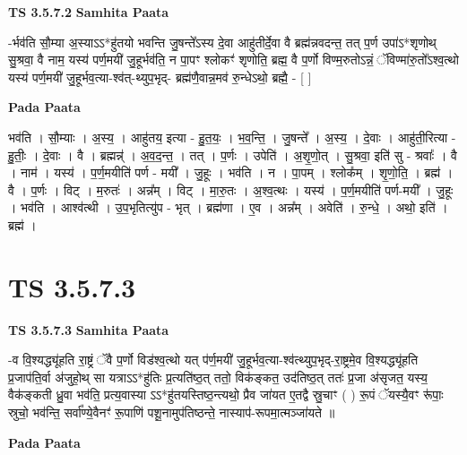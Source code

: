 \documentclass[17pt]{extarticle}
\begin{document}
\textbf{TS 3.5.7.2 } \newline
\textbf{Samhita Paata} \newline

-र्भव॑ति सौ॒म्या अ॒स्याऽऽ*हु॑तयो भवन्ति जु॒षन्ते᳚ऽस्य दे॒वा आहु॑तीर्दे॒वा वै ब्रह्म॑न्नवदन्त॒ तत् प॒र्ण उपा॑ऽ*शृणोथ् सु॒श्रवा॒ वै नाम॒ यस्य॑ पर्ण॒मयी॑ जु॒हूर्भव॑ति॒ न पा॒पꣳ श्लोकꣳ॑ शृणोति॒ ब्रह्म॒ वै प॒र्णो विण्म॒रुतोऽन्नं॒ ॅविण्मा॑रु॒तो᳚ऽश्व॒त्थो यस्य॑ पर्ण॒मयी॑ जु॒हूर्भव॒त्या-श्व॑त्-थ्युप॒भृद्- ब्रह्म॑णै॒वान्न॒मव॑ रु॒न्धेऽथो॒ ब्रह्मै॒ - [  ] \newline

\textbf{Pada Paata} \newline

भव॑ति । सौ॒म्याः । अ॒स्य॒ । आहु॑तय॒ इत्या - हु॒त॒यः॒ । भ॒व॒न्ति॒ । जु॒षन्ते᳚ । अ॒स्य॒ । दे॒वाः । आहु॑ती॒रित्या - हु॒तीः॒ । दे॒वाः । वै । ब्रह्मन्न्॑ । अ॒व॒द॒न्त॒ । तत् । प॒र्णः । उपेति॑ । अ॒शृ॒णो॒त् । सु॒श्रवा॒ इति॑ सु - श्रवाः᳚ । वै । नाम॑ । यस्य॑ । प॒र्ण॒मयीति॑ पर्ण - मयी᳚ । जु॒हूः । भव॑ति । न । पा॒पम् । श्लोक᳚म् । शृ॒णो॒ति॒ । ब्रह्म॑ । वै । प॒र्णः । विट् । म॒रुतः॑ । अन्न᳚म् । विट् । मा॒रु॒तः । अ॒श्व॒त्थः । यस्य॑ । प॒र्ण॒मयीति॑ पर्ण-मयी᳚ । जु॒हूः । भव॑ति । आश्व॑त्थी । उ॒प॒भृतित्यु॑प - भृत् । ब्रह्म॑णा । ए॒व । अन्न᳚म् । अवेति॑ । रु॒न्धे॒ । अथो॒ इति॑ । ब्रह्म॑ ।  \newline




\section*{ TS 3.5.7.3 }

\textbf{TS 3.5.7.3 } \newline
\textbf{Samhita Paata} \newline

-व वि॒श्यद्ध्यू॑हति रा॒ष्ट्रं ॅवै प॒र्णो विड॑श्व॒त्थो यत् प॑र्ण॒मयी॑ जु॒हूर्भव॒त्या-श्व॑त्थ्युप॒भृद्-रा॒ष्ट्रमे॒व वि॒श्यद्ध्यू॑हति प्र॒जाप॑ति॒र्वा अ॑जुहो॒थ् सा यत्राऽऽ*हु॑तिः प्र॒त्यति॑ष्ठ॒त् ततो॒ विक॑ङ्कत॒ उद॑तिष्ठ॒त् ततः॑ प्र॒जा अ॑सृजत॒ यस्य॒ वैक॑ङ्कती ध्रु॒वा भव॑ति॒ प्रत्य॒वास्या ऽऽ*हु॑तयस्तिष्ठ॒न्त्यथो॒ प्रैव जा॑यत ए॒तद्वै स्रु॒चाꣳ ( ) रू॒पं ॅयस्यै॒वꣳ रू॑पाः॒ स्रुचो॒ भव॑न्ति॒ सर्वा᳚ण्ये॒वैनꣳ॑ रू॒पाणि॑ पशू॒नामुप॑तिष्ठन्ते॒ नास्याप॑-रूपमा॒त्मञ्जा॑यते ॥ \newline

\textbf{Pada Paata} \newline
\end{document}
